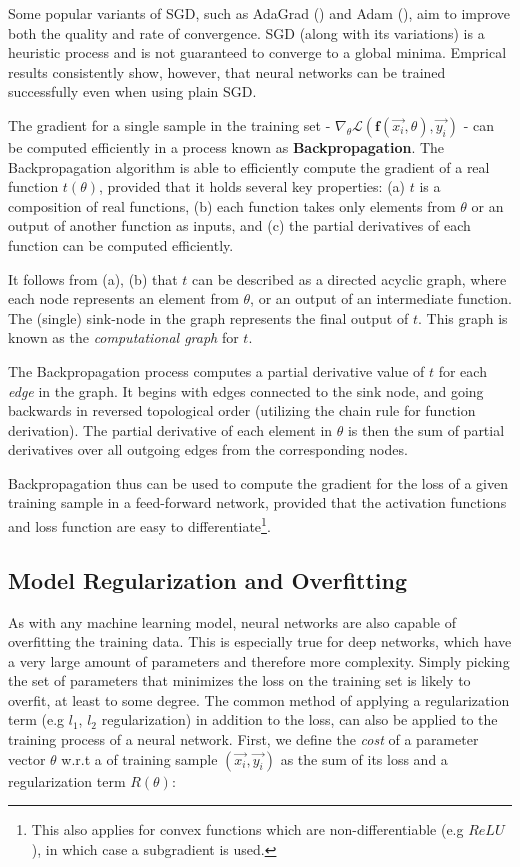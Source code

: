 Some popular variants of SGD, such as AdaGrad (\cite{adagrad}) and Adam (\cite{adam}), aim to improve both the quality and rate of convergence. SGD (along with its variations) is a heuristic process and is not guaranteed to converge to a global minima. Emprical results consistently show, however, that neural networks can be trained successfully even when using plain SGD.

The gradient for a single sample in the training set -  $\nabla_\theta \mathcal{L}(\textbf{f}(\vec{x_i}, \theta), \vec{y_i})$ - can be computed efficiently in a process known as \textbf{Backpropagation}. The Backpropagation
algorithm is able to efficiently compute the gradient of a real function $t(\theta)$, provided that it holds several key properties: (a) $t$ is a composition of real functions, (b) each function takes only elements from $\theta$ or an output of another function as inputs, and (c) the partial derivatives of each function can be computed efficiently.  

It follows from (a), (b) that $t$ can be described as a directed acyclic graph, where each node represents an element from $\theta$, or an output of an intermediate function. The (single) sink-node in the graph represents the final output of $t$. This graph is known as  the \textit{computational graph} for $t$.

The Backpropagation process computes a partial derivative value of $t$ for each \emph{edge} in the graph. It begins with edges connected to the sink node, and going backwards in reversed topological order (utilizing the chain rule for function derivation). The partial derivative of each element in $\theta$ is then the sum of partial derivatives over all outgoing edges from the corresponding nodes.

Backpropagation thus can be used to compute the gradient for the loss of a given training sample in a feed-forward network, provided that the activation functions and loss function are easy to differentiate\footnote{This also applies for convex functions which are non-differentiable (e.g $ReLU$), in which case a subgradient is used.}.

\subsection{Model Regularization and Overfitting} \label{sec:regulaization}

As with any machine learning model, neural networks are also capable of overfitting the training data. This is especially true for deep networks, which have a very large amount of parameters and therefore more complexity. Simply picking the set of parameters that minimizes the loss on the training set is likely to overfit, at least to some degree. The common method of applying a regularization term (e.g $l_1$, $l_2$ regularization) in addition to the loss, can also be applied to the training process of a neural network. First, we define the \emph{cost} of a parameter vector $\theta$ w.r.t a of training sample $(\vec{x_i}, \vec{y_i})$ as the sum of its loss and a regularization term $R(\theta)$:

